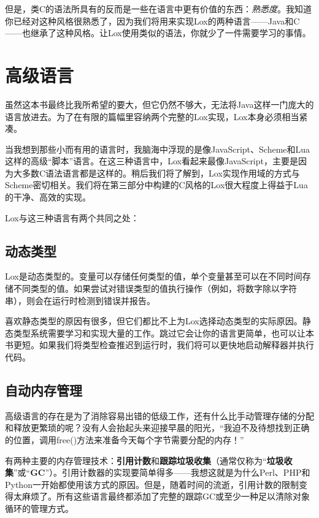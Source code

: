 \documentclass[cn,11pt,chinese]{elegantbook}
\begin{document}
但是，类C的语法所具有的反而是一些在语言中更有价值的东西：\textit{熟悉度}。我知道你已经对这种风格很熟悉了，因为我们将用来实现Lox的两种语言——Java和C——也继承了这种风格。让Lox使用类似的语法，你就少了一件需要学习的事情。

\section{高级语言}

虽然这本书最终比我所希望的要大，但它仍然不够大，无法将Java这样一门庞大的语言放进去。为了在有限的篇幅里容纳两个完整的Lox实现，Lox本身必须相当紧凑。

当我想到那些小而有用的语言时，我脑海中浮现的是像JavaScript、Scheme和Lua这样的高级“脚本”语言。在这三种语言中，Lox看起来最像JavaScript，主要是因为大多数C语法语言都是这样的。稍后我们将了解到，Lox实现作用域的方式与Scheme密切相关。我们将在第三部分中构建的C风格的Lox很大程度上得益于Lua的干净、高效的实现。

Lox与这三种语言有两个共同之处：

\subsection{动态类型}

Lox是动态类型的。变量可以存储任何类型的值，单个变量甚至可以在不同时间存储不同类型的值。如果尝试对错误类型的值执行操作（例如，将数字除以字符串），则会在运行时检测到错误并报告。

喜欢静态类型的原因有很多，但它们都比不上为Lox选择动态类型的实际原因。静态类型系统需要学习和实现大量的工作。跳过它会让你的语言更简单，也可以让本书更短。如果我们将类型检查推迟到运行时，我们将可以更快地启动解释器并执行代码。

\subsection{自动内存管理}

高级语言的存在是为了消除容易出错的低级工作，还有什么比手动管理存储的分配和释放更繁琐的呢？没有人会抬起头来迎接早晨的阳光，“我迫不及待想找到正确的位置，调用free()方法来准备今天每个字节需要分配的内存！”

有两种主要的内存管理技术：\textbf{引用计数}和\textbf{跟踪垃圾收集}（通常仅称为“\textbf{垃圾收集}”或“\textbf{GC}”）。引用计数器的实现要简单得多——我想这就是为什么Perl、PHP和Python一开始都使用该方式的原因。但是，随着时间的流逝，引用计数的限制变得太麻烦了。所有这些语言最终都添加了完整的跟踪GC或至少一种足以清除对象循环的管理方式。
\end{document}
